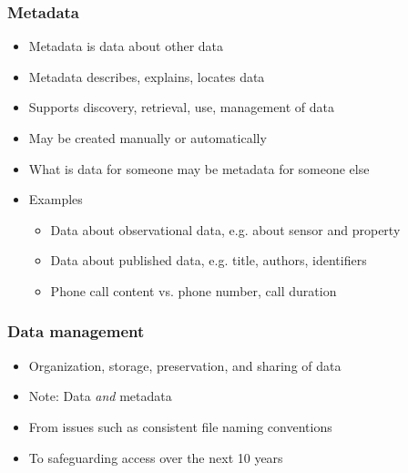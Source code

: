 \documentclass{beamer}
\begin{document}
\begin{frame}
  \frametitle{Metadata}
  
  \begin{itemize}
  \item Metadata is data about other data
  \item Metadata describes, explains, locates data
  \item Supports discovery, retrieval, use, management of data
  \item May be created manually or automatically
  \item What is data for someone may be metadata for someone else
  \item Examples
  \begin{itemize}
    \item Data about observational data, e.g. about sensor and property
    \item Data about published data, e.g. title, authors, identifiers
    \item Phone call content vs. phone number, call duration
  \end{itemize}
  \end{itemize}
\end{frame}

\begin{frame}
  \frametitle{Data management}
  
  \begin{itemize}
  \item Organization, storage, preservation, and sharing of data 
  \item Note: Data \emph{and} metadata
  \item From issues such as consistent file naming conventions
  \item To safeguarding access over the next 10 years
  \end{itemize}
\end{frame}
\end{document}
